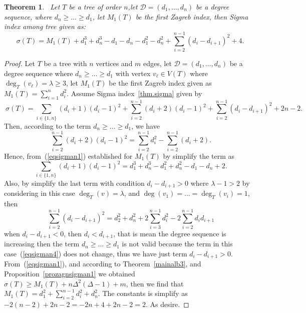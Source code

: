 \documentclass[12pt]{amsart}
\newtheorem{theorem}{Theorem}[section]
\begin{document}
\begin{theorem}~\label{thm.sigman3}
Let $T$ be a tree of order $n$,let $\mathscr{D}=(d_1,\dots,d_n)$ be a degree sequence, where $d_n\geqslant \dots \geqslant d_1$, let $M_1(T)$ be the first Zagreb index, then Sigma index among tree given as:
\[
\sigma(T)=M_1(T)+d_1^3 + d_n^3 - d_1 - d_n - d_1^2 - d_n^2 + \sum_{i=2}^{n-1} (d_i - d_{i+1})^2 + 4.
\]
\end{theorem}
\begin{proof}
Let $T$ be a tree with $n$ vertices and $m$ edges, let $\mathscr{D}=(d_1,\dots,d_n)$ be a degree sequence where $d_n\geqslant\dots\geqslant d_1$ with vertex $v_\ell \in V(T)$ where $\deg_T(v_\ell)=\lambda\geqslant 3$, let $M_1(T)$ be the first Zagreb index given as $M_1(T)=\sum_{i=1}^{n} d_i^2$. Assume Sigma index~\ref{thm.sigma} given by
\begin{equation}~\label{eqsigman1}
 \sigma(T)=\sum_{i\in\{1,n\}}(d_i+1)(d_i-1)^2+\sum_{i=2}^{n-1}(d_i+2)(d_i-1)^2+\sum_{i=2}^{n-1}(d_i-d_{i+1})^2+2n-2.   
\end{equation}
Then, according to the term $d_n\geqslant\dots\geqslant d_1$, we have
\begin{equation}~\label{eqsigman2}
 \sum_{i=2}^{n-1}(d_i+2)(d_i-1)^2=  \sum_{i=2}^{n-1} d_i^2- \sum_{i=2}^{n-1}(d_i+2).
\end{equation}
Hence, from~(\ref{eqsigman1}) established for $M_1(T)$ by simplify the term as 
\begin{equation}~\label{eqsigman3}
  \sum_{i\in\{1,n\}}(d_i+1)(d_i-1)^2 =d_1^3 + d_n^3 -d_1^2+d_n^2- d_1 - d_n + 2 .
\end{equation}
Also, by simplify the last term with condition $d_i-d_{i+1}>0$ where $\lambda-1>2$ by considering in this case $\deg_T(v)=\lambda$, and $\deg(v_1)=\dots=\deg_T(v_i)=1$, then 
\begin{equation}~\label{eqsigman4}
  \sum_{i=2}^{n-1}(d_i-d_{i+1})^2= d_2^2 + d_n^2 + 2\sum_{i=3}^{n-1} d_i^2 - 2\sum_{i=2}^{n-1} d_i d_{i+1}
\end{equation}
when $d_i-d_{i+1}<0$, then $d_i<d_{i+1}$, that is mean the degree sequence is increasing then the term $d_n\geqslant\dots\geqslant d_1$ is not valid because the term in this case~(\ref{eqsigman4}) does not change, thus we have just term $d_i-d_{i+1}>0$. From~(\ref{eqsigman1}), and according to Theorem~\ref{mainalb3}, and Proposition~\ref{prozagnsigman1} we obtained $\sigma(T)\geq M_1(T)+n\Delta^2(\Delta-1)+m$, then we find that $M_1(T)=d_1^2 + \sum_{i=2}^{n-1} d_i^2 + d_n^2$. The constants is simplify as $-2(n-2) + 2n - 2 = -2n + 4 + 2n - 2 = 2$. As desire.

\end{proof}
\end{document}
